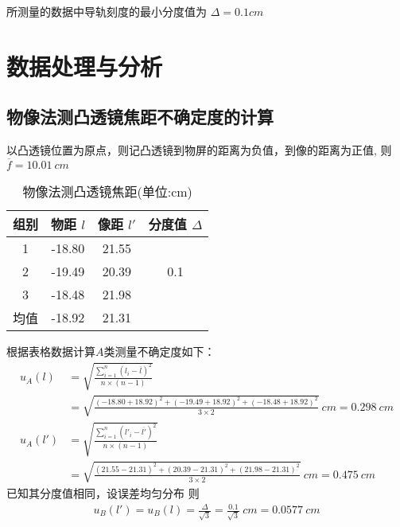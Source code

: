 \documentclass[UTF8]{ctexart}
\begin{document}
所测量的数据中导轨刻度的最小分度值为 $ \Delta = 0.1cm$


\newpage

\section{数据处理与分析}

\subsection{物像法测凸透镜焦距不确定度的计算}

以凸透镜位置为原点，则记凸透镜到物屏的距离为负值，到像的距离为正值, 则$\overline{f} = 10.01 \ cm $
\vspace{5cm} %

\begin{table}[H]
\centering
\caption{物像法测凸透镜焦距(单位:cm)}
\begin{tabular}{|c|c|c|c|}
\hline
 组别  &  物距 $l$ & 像距 $l'$ & 分度值 $\Delta$   \\
 \hline
  1   &  -18.80 & 21.55  &  \multirow{3}{*}{0.1}  \\
\cline{1-3}
  2   &  -19.49 & 20.39  & \\
\cline{1-3}
  3   &  -18.48 &  21.98  & \\
\hline
均值  &  -18.92 &  21.31 &  \\
\hline
\end{tabular}
\end{table}
根据表格数据计算$A$类测量不确定度如下：
\begin{align*}
    u_A(l) &= \sqrt{
    \frac{\sum_{i=1}^n (l_i - 
    \overline{l})^2}
    {n\times (n-1)}
    }   \\
         &= \sqrt{\frac{(-18.80 + 18.92)^2 +
         (-19.49 + 18.92)^2 +
         (-18.48 + 18.92)^2 }
         { 3\times 2}} \ cm = 0.298 \ cm \\
    u_A(l') &= \sqrt{\frac{\sum_{i=1}^n (l'_i - \overline{l'})^2}{n\times (n-1)}} \\
     &= \sqrt{\frac{(21.55 -21.31 )^2 +
         (20.39 -21.31)^2 +
         (21.98 -21.31)^2 }
         { 3\times 2}} \ cm = 0.475\ cm
\end{align*}
已知其分度值相同，设误差均匀分布 则
\begin{align*}
     u_B(l')  = u_B(l) = \frac{\Delta}{\sqrt{3}} = \frac{0.1}{\sqrt{3}} \ cm= 0.0577 \ cm \\
\end{align*}
\end{document}
